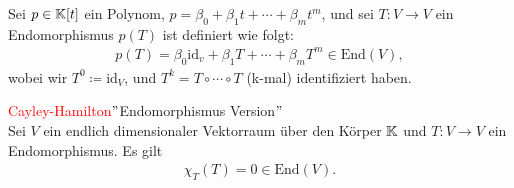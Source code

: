 \begin{definition}
Sei $p\in\mathbb{K}[t]$ ein Polynom, $p=\beta_0+\beta_1t+\dotsb+\beta_mt^m$, und sei $T:V\to V$ ein Endomorphismus $p(T)$ ist definiert wie folgt:
\begin{align*}
    p(T)=\beta_0\text{id}_v+\beta_1T+\dotsb+\beta_mT^m\in\text{End}(V),
\end{align*}
wobei wir $T^0\coloneqq$id$_V$, und $T^k=T\circ\dotsb\circ T$ (k-mal) identifiziert haben.
\end{definition}

\begin{theorem}
\textcolor{red}{Cayley-Hamilton}\quad $"$Endomorphismus Version$"$\\
Sei $V$ ein endlich dimensionaler Vektorraum über den Körper $\mathbb{K}$ und $T:V\to V$ ein Endomorphismus. Es gilt
\begin{align*}
    \chi_T(T)=0\in\text{End}(V).
\end{align*}
\end{theorem}